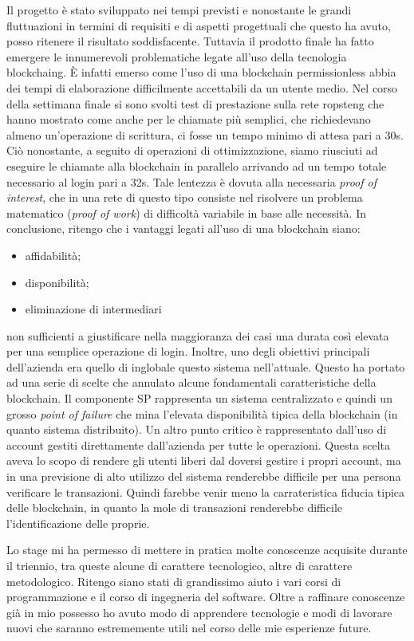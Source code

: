 Il progetto è stato sviluppato nei tempi previsti e nonostante le grandi fluttuazioni in termini di requisiti e di aspetti progettuali che questo ha avuto, posso ritenere il risultato soddisfacente. Tuttavia il prodotto finale ha fatto emergere le innumerevoli problematiche legate all'uso della tecnologia \gls{blockchaing}. È infatti emerso come l'uso di una blockchain permissionless abbia dei tempi di elaborazione difficilmente accettabili da un utente medio. Nel corso della settimana finale si sono svolti test di prestazione sulla rete \gls{ropsteng} che hanno mostrato come anche per le chiamate più semplici, che richiedevano almeno un'operazione di scrittura, ci fosse un tempo minimo di attesa pari a 30s. Ciò nonostante, a seguito di operazioni di ottimizzazione, siamo riusciuti ad eseguire le chiamate alla blockchain in parallelo arrivando ad un tempo totale necessario al login pari a 32s. Tale lentezza è dovuta alla necessaria \emph{proof of interest}, che in una rete di questo tipo consiste nel risolvere un problema matematico (\emph{proof of work}) di difficoltà variabile in base alle necessità.  
In conclusione, ritengo che i vantaggi legati all'uso di una blockchain siano:
\begin{itemize}
    \item affidabilità;
    \item disponibilità;
    \item eliminazione di intermediari
\end{itemize} 
non sufficienti a giustificare nella maggioranza dei casi una durata così elevata per una semplice operazione di login.
Inoltre, uno degli obiettivi principali dell'azienda era quello di inglobale questo sistema nell'attuale. Questo ha portato ad una serie di scelte che annulato alcune fondamentali caratteristiche della blockchain. Il componente SP rappresenta un sistema centralizzato e quindi un grosso \emph{point of failure} che mina l'elevata disponibilità tipica della blockchain (in quanto sistema distribuito). Un altro punto critico è rappresentato dall'uso di account gestiti direttamente dall'azienda per tutte le operazioni. Questa scelta aveva lo scopo di rendere gli utenti liberi dal doversi gestire i propri account, ma in una previsione di alto utilizzo del sistema renderebbe difficile per una persona verificare le transazioni. Quindi farebbe venir meno la carrateristica fiducia tipica delle blockchain, in quanto la mole di transazioni renderebbe difficile l'identificazione delle proprie.

Lo stage mi ha permesso di mettere in pratica molte conoscenze acquisite durante il triennio, tra queste alcune di carattere tecnologico, altre di carattere metodologico. Ritengo siano stati di grandissimo aiuto i vari corsi di programmazione e il corso di ingegneria del software. Oltre a raffinare conoscenze già in mio possesso ho avuto modo di apprendere tecnologie e modi di lavorare nuovi che saranno estrememente utili nel corso delle mie esperienze future.


